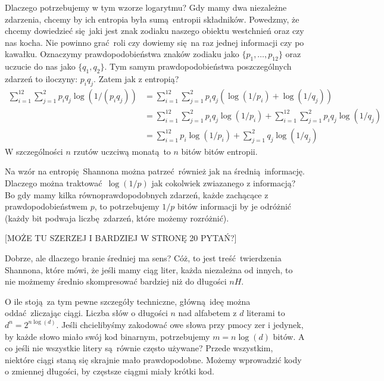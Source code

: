 \documentclass[10pt,a4paper]{article}
\begin{document}

Dlaczego potrzebujemy w tym wzorze logarytmu? 
Gdy mamy dwa niezależne zdarzenia, chcemy by ich entropia była sumą entropii składników.
%
%
Powedzmy, że chcemy dowiedzieć się jaki jest znak zodiaku naszego obiektu westchnień oraz czy nas kocha.
Nie powinno grać roli czy dowiemy się na raz jednej informacji czy po kawałku.
Oznaczymy prawdopodobieństwa znaków zodiaku jako $\{p_1, \ldots, p_{12} \}$ oraz uczucie do nas jako $\{q_1, q_2\}$.
Tym samym prawdopodobieństwa poszczególnych zdarzeń to iloczyny: $p_i q_j$.
Zatem jak z entropią?
%
\begin{align}
    \sum_{i=1}^{12} \sum_{j=1}^2 p_i q_j \log(1/(p_i q_j))
    &= \sum_{i=1}^{12} \sum_{j=1}^2 p_i q_j \left( \log(1/p_i) + \log(1/q_j) \right)\\
    &= \sum_{i=1}^{12} \sum_{j=1}^2 p_i q_j \log(1/p_i)
    +\sum_{i=1}^{12} \sum_{j=1}^2 p_i q_j \log(1/q_j)\\
    &= \sum_{i=1}^{12} p_i \log(1/p_i)
    + \sum_{j=1}^2 q_j \log(1/q_j)
\end{align}
%
W szczególności $n$ rzutów uczciwą monatą to $n$ bitów bitów entropii.

Na wzór na entropię Shannona można patrzeć również jak na średnią informację.
Dlaczego można traktować $\log(1/p)$ jak cokolwiek zwiazanego z informacją?
Bo gdy mamy kilka równoprawdopodobnych zdarzeń, każde zachącące z prawdopodobieństwem $p$,
to potrzebujemy $1/p$ bitów informacji by je odróżnić (każdy bit podwaja liczbę zdarzeń, które możemy rozróżnić).

[MOŻE TU SZERZEJ I BARDZIEJ W STRONĘ 20 PYTAŃ?]

Dobrze, ale dlaczego branie średniej ma sens?
Cóż, to jest treść twierdzenia Shannona, które mówi, że jeśli mamy ciąg liter,
każda niezależna od innych, to nie możmemy średnio skompresować bardziej niż do długości $n H$.

O ile stoją za tym pewne szczegóły techniczne, główną ideę można oddać zliczając ciągi.
Liczba słów o długości $n$ nad alfabetem z $d$ literami to $d^n=2^{n \log(d)}$.
Jeśli chcielibyśmy zakodować owe słowa przy pmocy zer i jedynek,
by każde słowo miało swój kod binarnym, potrzebujemy $m = n \log(d)$ bitów.
A co jeśli nie wszystkie litery są równie często używane?
Przede wszystkim, niektóre ciągi staną się skrajnie mało prawdopodobne.
Możemy wprowadzić kody o zmiennej długości, by częstsze ciągmi miały krótki kod.
\end{document}
